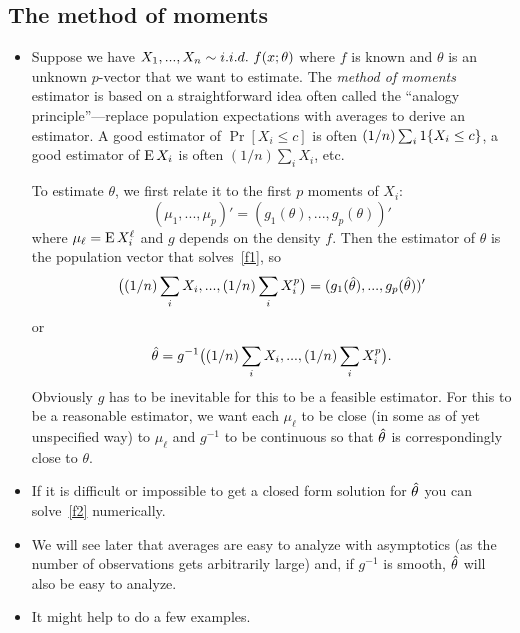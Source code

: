 \subsection{The method of moments}

\begin{itemize}[leftmargin=0pt]
\item Suppose we have $X_1,...,X_n \sim \iid\ f(x; \theta)$ where $f$ is known
  and $\theta$ is an unknown $p$-vector that we want to estimate.  The
  \emph{method of moments} estimator is based on a straightforward
  idea often called the ``analogy principle''---replace population
  expectations with averages to derive an estimator.  A good estimator
  of $\Pr[X_i \leq c]$ is often $(1/n) \sum_i \operatorname{1}\{X_i \leq c\}$, a good
  estimator of $\operatorname{E} X_i$ is often $(1/n) \sum_i X_i$, etc.

  To estimate $\theta$, we first relate it to the first $p$ moments of
  $X_i$:
  \begin{equation}\label{f1}
    (\mu_1,...,\mu_p)' = (g_1(\theta),...,g_p(\theta))'
  \end{equation}
  where $\mu_\ell = \operatorname{E} X_i^\ell$ and $g$ depends on the density $f$.  Then the
  estimator of $\theta$ is the population vector that solves~\eqref{f1},
  so
  \begin{equation}\label{f2}
    \big((1/n) \sum_i X_i,...,(1/n) \sum_i X_i^p\big)
    = (g_1(\hat{\theta}),...,g_p(\hat{\theta}))'
  \end{equation}
  or
  \begin{equation*}
    \hat{\theta} = g^{-1}\big((1/n) \sum_i X_i,...,(1/n) \sum_i X_i^p\big).
  \end{equation*}
  Obviously $g$ has to be inevitable for this to be a feasible
  estimator.  For this to be a reasonable estimator, we want each
  $\mu_\ell$ to be close (in some as of yet unspecified way) to $\mu_\ell$ and
  $g^{-1}$ to be continuous so that $\hat{\theta}$ is correspondingly close to
  $\theta$.

\item If it is difficult or impossible to get a closed form solution
  for $\hat{\theta}$ you can solve~\eqref{f2} numerically.

\item We will see later that averages are easy to analyze with
  asymptotics (as the number of observations gets arbitrarily large)
  and, if $g^{-1}$ is smooth, $\hat{\theta}$ will also be easy to analyze.

\item It might help to do a few examples.


\end{itemize}
